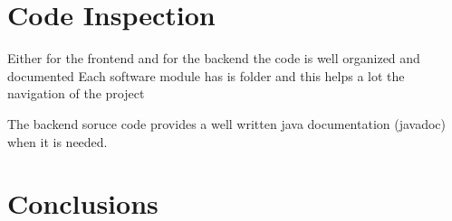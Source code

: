 \section{Code Inspection}
Either for the frontend and for the backend the code is well organized and documented
Each software module has is folder and this helps a lot the navigation 
of the project

The backend soruce code provides a well written java documentation (javadoc) 
when it is needed. %
\section{Conclusions}